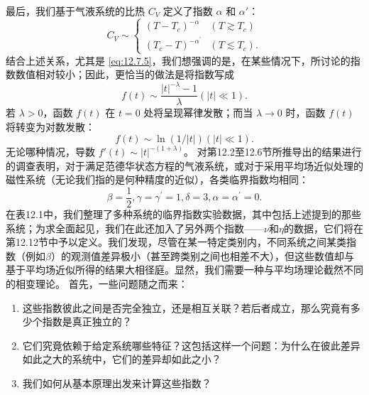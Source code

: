 最后，我们基于气液系统的比热 \(C_V\) 定义了指数 \(\alpha\) 和 \(\alpha'\)：
\begin{equation}\tag{12.7.5}\label{eq:12.7.5}
C _ { V } \sim \left\{ \begin{array}{ll} { { ( T - T _ { c } ) ^{- \alpha} } } & { { ( T \gtrsim T _ { c } ) } } \\{ { ( T _ { c } - T ) ^{- \alpha ^ { \prime} } } } & { { ( T \lesssim T _ { c } ) . } } \end{array} \right.
\end{equation}
结合上述关系，尤其是 \autoref{eq:12.7.5}，我们想强调的是，在某些情况下，所讨论的指数数值相对较小；因此，更恰当的做法是将指数写成
\begin{equation}\tag{12.7.6}\label{eq:12.7.6}
f ( t ) \sim \frac { | t | ^{- \lambda} - 1 } { \lambda }  ( | t | \ll 1 ) .
\end{equation}
若 \(\lambda > 0\)，函数 \(f(t)\) 在 \(t = 0\) 处将呈现幂律发散；而当 \(\lambda \to 0\) 时，函数 \(f(t)\) 将转变为对数发散：
\begin{equation}\tag{12.7.7}\label{eq:12.7.7}
f ( t ) \sim \ln ( 1 / | t | )  ( | t | \ll 1 ) .
\end{equation}
无论哪种情况，导数 \(f'(t) \sim |t|^{-(1+\lambda)}\)。
对第12.2至12.6节所推导出的结果进行的调查表明，对于满足范德华状态方程的气液系统，或对于采用平均场近似处理的磁性系统（无论我们指的是何种精度的近似），各类临界指数均相同：
\begin{equation}\tag{12.7.8}\label{eq:12.7.8}
\beta = \frac { 1 } { 2 } ,  \gamma = \gamma ^{\prime} = 1 ,  \delta = 3 ,  \alpha = \alpha ^{\prime} = 0 .
\end{equation}
在表12.1中，我们整理了多种系统的临界指数实验数据，其中包括上述提到的那些系统；为求全面起见，我们在此还加入了另外两个指数——\(\nu\)和\(\eta\)的数据，它们将在第12.12节中予以定义。我们发现，尽管在某一特定类别内，不同系统之间某类指数（例如\(\beta\)）的观测值差异极小（甚至跨类别之间也相差不大），但这些数值却与基于平均场近似所得的结果大相径庭。显然，我们需要一种与平均场理论截然不同的相变理论。
首先，一些问题随之而来：
\begin{enumerate}
\def\labelenumi{(\roman{enumi})}
\item
  这些指数彼此之间是否完全独立，还是相互关联？若后者成立，那么究竟有多少个指数是真正独立的？
\item
  它们究竟依赖于给定系统哪些特征？这包括这样一个问题：为什么在彼此差异如此之大的系统中，它们的差异却如此之小？
\item
  我们如何从基本原理出发来计算这些指数？
\end{enumerate}
